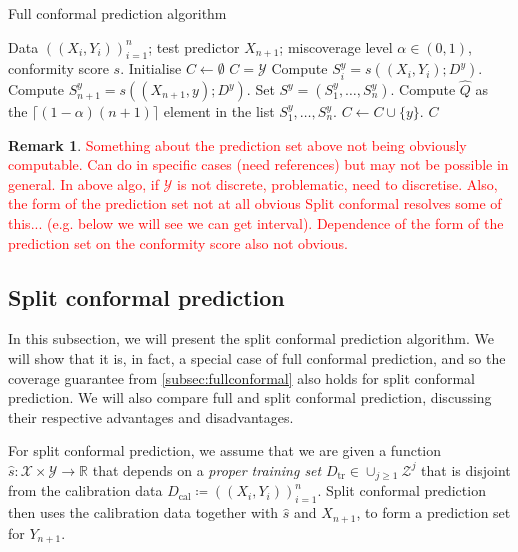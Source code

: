 \documentclass[11pt, titlepage]{article} %
\numberwithin{equation}{section}
\theoremstyle{definition}
\newtheorem{remark}{Remark}
\numberwithin{theorem}{section}
\numberwithin{lemma}{section}
\numberwithin{corollary}{section}
\numberwithin{proposition}{section}
\numberwithin{definition}{section}
\numberwithin{remark}{section}
\begin{document}
\begin{algorithm}[H]
\caption{Full conformal prediction algorithm}
\label{alg:fullconformal}
\begin{algorithmic}
    \Require Data \(((X_i, Y_i))_{i=1}^n\); test predictor \(X_{n+1}\); miscoverage level \(\alpha \in (0,1)\), conformity score \(s\).
    \State Initialise \(C \gets \emptyset\)
        \State \(C = \mathcal{Y}\)
    \Else
            \State Compute \(S_i^y = s((X_i, Y_i); D^y)\).
            \State Compute \(S_{n+1}^y = s((X_{n+1}, y); D^y)\).
            \State Set \(S^y = (S_1^y, \ldots, S_{n}^y)\).
            \State Compute \(\hat{Q}\) as the \(\lceil (1-\alpha)(n+1) \rceil \) element in the list \(S_1^y, \ldots, S_{n}^y\).
                \State \(C \gets C \cup \{y\} \).
            \EndIf      
        \EndFor
    \EndIf
    \Ensure \(C\)
\end{algorithmic}
\end{algorithm}

\begin{remark}
    \textcolor{red}{Something about the prediction set above not being obviously computable. Can do in specific cases (need references) but may not be possible in general. In above algo, if \(\mathcal{Y}\) is not discrete, problematic, need to discretise. Also, the form of the prediction set not at all obvious Split conformal resolves some of this... (e.g. below we will see we can get interval). Dependence of the form of the prediction set on the conformity score also not obvious.}
\end{remark}

\subsection{Split conformal prediction}
\label{subsec:splitconformal}

In this subsection, we will present the split conformal prediction algorithm. We will show that it is, in fact, a special case of full conformal prediction, and so the coverage guarantee from \cref{subsec:fullconformal} also holds for split conformal prediction. We will also compare full and split conformal prediction, discussing their respective advantages and disadvantages.\vskip5pt

\noindent
For split conformal prediction, we assume that we are given a function \(\hat{s}:\mathcal{X} \times \mathcal{Y} \to \mathbb{R}\) that depends on a \textit{proper training set} \(D_\mathrm{tr} \in \cup_{j \geq 1} \mathcal{Z}^j \) that is disjoint from the calibration data \(D_\mathrm{cal} \coloneqq ((X_i, Y_i))_{i=1}^n\).  Split conformal prediction then uses the calibration data together with \(\hat{s}\) and \(X_{n+1}\), to form a prediction set for \(Y_{n+1}\). \vskip5pt
\end{document}
